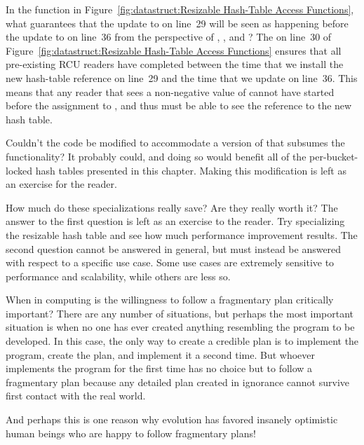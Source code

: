 \begin{enumerate}
\QuickQ{}
	In the  function in
	Figure~\ref{fig:datastruct:Resizable Hash-Table Access Functions},
	what guarantees that the update to  on line~29
	will be seen as happening before the update to 
	on line~36 from the perspective of ,
	, and ?
\QuickA{}
	The  on line~30 of
	Figure~\ref{fig:datastruct:Resizable Hash-Table Access Functions}
	ensures that all pre-existing RCU readers have completed between
	the time that we install the new hash-table reference on
	line~29 and the time that we update  on
	line~36.
	This means that any reader that sees a non-negative value
	of  cannot have started before the
	assignment to , and thus must be able to see
	the reference to the new hash table.

\QuickQ{}
	Couldn't the  code be modified to accommodate
	a version of  that subsumes the
	 functionality?
\QuickA{}
	It probably could, and doing so would benefit all of the
	per-bucket-locked hash tables presented in this chapter.
	Making this modification is left as an exercise for the
	reader.

\QuickQ{}
	How much do these specializations really save?
	Are they really worth it?
\QuickA{}
	The answer to the first question is left as an exercise to
	the reader.
	Try specializing the resizable hash table and see how much
	performance improvement results.
	The second question cannot be answered in general, but must
	instead be answered with respect to a specific use case.
	Some use cases are extremely sensitive to performance and
	scalability, while others are less so.

\QuickQ{}
	When in computing is the willingness to follow a fragmentary
	plan critically important?
\QuickA{}
	There are any number of situations, but perhaps the most important
	situation is when no one has ever created anything resembling
	the program to be developed.
	In this case, the only way to create a credible plan is to
	implement the program, create the plan, and implement it a
	second time.
	But whoever implements the program for the first time has no
	choice but to follow a fragmentary plan because any detailed
	plan created in ignorance cannot survive first contact with
	the real world.

	And perhaps this is one reason why evolution has favored insanely
	optimistic human beings who are happy to follow fragmentary plans!


\end{enumerate}
